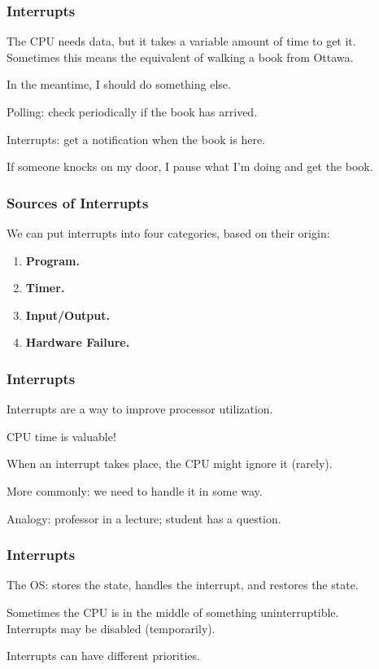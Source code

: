 \begin{frame}
	\frametitle{Interrupts}
	The CPU needs data, but it takes a variable amount of time to get it.\\
	\quad Sometimes this means the equivalent of walking a book from Ottawa.

	In the meantime, I should do something else.

	Polling: check periodically if the book has arrived.

	Interrupts: get a notification when the book is here.

	If someone knocks on my door, I pause what I'm doing and get the book.


\end{frame}

\begin{frame}
	\frametitle{Sources of Interrupts}

	We can put interrupts into four categories, based on their origin:

	\begin{enumerate}
		\item \textbf{Program.}
		\item \textbf{Timer.}
		\item \textbf{Input/Output.}
		\item \textbf{Hardware Failure.}
	\end{enumerate}


\end{frame}

\begin{frame}
	\frametitle{Interrupts}
	Interrupts are a way to improve processor utilization.

	CPU time is valuable!

	When an interrupt takes place, the CPU might ignore it (rarely).

	More commonly: we need to \alert{handle} it in some way.

	Analogy: professor in a lecture; student has a question.


\end{frame}

\begin{frame}
	\frametitle{Interrupts}
	The OS: stores the state, handles the interrupt, and restores the state.

	Sometimes the CPU is in the middle of something uninterruptible.\\
	\quad Interrupts may be disabled (temporarily).

	Interrupts can have different priorities.
\end{frame}

